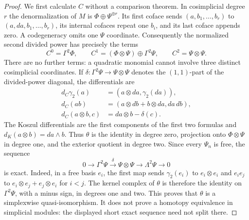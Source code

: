 \begin{proof}
We first calculate $C$ without a comparison theorem. In cosimplicial
degree $r$ the denormalization of $M$ is
$\Phi\oplus\Psi^{\oplus r}$. Its first coface sends
$(a,b_1,\ldots,b_r)$ to $(a,da,b_1,\ldots,b_r)$, its internal
cofaces repeat one $b_i$, and its last coface appends zero.
A codegeneracy omits one $\Psi$ coordinate. Consequently the
normalized second divided power has precisely the terms
\[
 C^0=\Gamma^2\Phi,\qquad
 C^1=(\Phi\otimes\Psi)\oplus\Gamma^2\Psi,\qquad
 C^2=\Psi\otimes\Psi.
\]
There are no further terms: a quadratic monomial cannot involve
three distinct cosimplicial coordinates. If
$\delta:\Gamma^2\Psi\to\Psi\otimes\Psi$ denotes the
$(1,1)$-part of the divided-power diagonal, the differentials are
\begin{align*}
 d_C\gamma_2(a)&=(a\otimes da,\gamma_2(da)),\\
 d_C(ab)&=(a\otimes db+b\otimes da,da\,db),\\
 d_C(a\otimes b,c)&=da\otimes b-\delta(c).
\end{align*}
The Koszul differentials are the first components of the first two
formulas and $d_K(a\otimes b)=da\wedge b$.
Thus $\theta$ is the identity in degree zero, projection onto
$\Phi\otimes\Psi$ in degree one, and the exterior quotient in
degree two. Since every $\Psi_n$ is free, the sequence
\[
 0\longrightarrow\Gamma^2\Psi
 \xrightarrow{\delta}\Psi\otimes\Psi
 \longrightarrow\Lambda^2\Psi\longrightarrow0
\]
is exact. Indeed, in a free basis $e_i$, the first map sends
$\gamma_2(e_i)$ to $e_i\otimes e_i$ and $e_ie_j$ to
$e_i\otimes e_j+e_j\otimes e_i$ for $i<j$.
The kernel complex of $\theta$ is therefore the identity on
$\Gamma^2\Psi$, with a minus sign, in degrees one and two.
This proves that $\theta$ is a simplexwise quasi-isomorphism.
It does not prove a homotopy equivalence in simplicial modules:
the displayed short exact sequence need not split there.


\end{proof}
